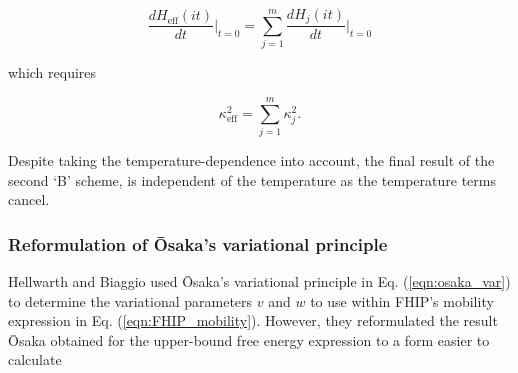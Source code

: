 \begin{equation}
    \frac{dH_{\text{eff}}(it)}{dt} \biggr\rvert_{t=0} = \sum_{j=1}^m \frac{dH_{j}(it)}{dt} \biggr\rvert_{t=0}
\end{equation}

which requires

\begin{equation} \label{eqn:hellwarth_scheme_f}
    \kappa_{\text{eff}}^2 = \sum_{j=1}^m \kappa_j^2.
\end{equation}

Despite taking the temperature-dependence into account, the final result of the second `B' scheme, is independent of the temperature as the temperature terms cancel.

\subsubsection{Reformulation of \=Osaka's variational principle}

Hellwarth and Biaggio used \=Osaka's variational principle in Eq. (\ref{eqn:osaka_var}) to determine the variational parameters $v$ and $w$ to use within FHIP's mobility expression in Eq. (\ref{eqn:FHIP_mobility}). However, they reformulated the result \=Osaka obtained for the upper-bound free energy expression to a form easier to calculate

